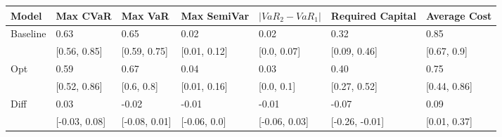 \begin{tabular}{lllllll}
\toprule
   Model &      Max CVaR &       Max VaR &  Max SemiVar & $|VaR_2 - VaR_1|$ & Required Capital & Average Cost \\
\midrule
Baseline &          0.63 &          0.65 &         0.02 &              0.02 &             0.32 &         0.85 \\
         &  [0.56, 0.85] &  [0.59, 0.75] & [0.01, 0.12] &       [0.0, 0.07] &     [0.09, 0.46] &  [0.67, 0.9] \\
     Opt &          0.59 &          0.67 &         0.04 &              0.03 &             0.40 &         0.75 \\
         &  [0.52, 0.86] &    [0.6, 0.8] & [0.01, 0.16] &        [0.0, 0.1] &     [0.27, 0.52] & [0.44, 0.86] \\
    Diff &          0.03 &         -0.02 &        -0.01 &             -0.01 &            -0.07 &         0.09 \\
         & [-0.03, 0.08] & [-0.08, 0.01] & [-0.06, 0.0] &     [-0.06, 0.03] &   [-0.26, -0.01] & [0.01, 0.37] \\
\bottomrule
\end{tabular}
